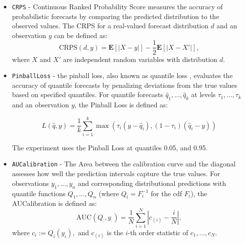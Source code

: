 \begin{itemize}
    
    \item \texttt{CRPS} - Continuous Ranked Probability Score \cite{matheson1976} measures the accuracy of probabilistic forecasts by comparing the predicted distribution to the observed values. The CRPS for a real-valued forecast distribution $d$ and an observation $y$ can be defined as:
    \[
    \text{CRPS}(d, y) = \mathbf{E} \left[ \left| X - y \right| \right] - \frac{1}{2} \mathbf{E} \left[ \left| X - X' \right| \right],
    \]
    where $X$ and $X'$ are independent random variables with distribution $d$.
    
    \item \texttt{PinballLoss} - the pinball loss, also known as quantile loss \cite{pinball_loss}, evaluates the accuracy of quantile forecasts by penalizing deviations from the true values based on specified quantiles.
    For quantile forecasts $\hat{q}_1, \dots, \hat{q}_k$ at levels $\tau_1, \dots, \tau_k$ and an observation $y$, the Pinball Loss is defined as:

    \begin{equation}
    L(\hat{q}, y) = \frac{1}{k} \sum_{i=1}^k \max \left(\tau_i (y - \hat{q}_i), (1 - \tau_i) (\hat{q}_i - y)\right)
    \end{equation}

    The experiment uses the Pinball Loss at quantiles 0.05, and 0.95.

    \item \texttt{AUCalibration} - The Area between the calibration curve and the diagonal assesses how well the prediction intervals capture the true values. For observations $y_1, \dots, y_n$ and corresponding distributional predictions with quantile functions $Q_1, \dots, Q_n$ (where $Q_i = F^{-1}_i$ for the cdf $F_i$), the AUCalibration is defined as:
    \begin{equation}
    \mbox{AUC} (Q_:, y_:) = \frac{1}{N} \sum_{i=1}^N \left| c_{(i)} - \frac{i}{N}\right|,
    \end{equation}
    where $c_i := Q_i(y_i),$ and $c_{(i)}$ is the $i$-th order statistic of $c_1, \dots, c_N$.


\end{itemize}
